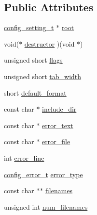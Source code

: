 \subsection*{Public Attributes}
\begin{DoxyCompactItemize}
\item 
\hyperlink{structconfig__setting__t}{config\-\_\-setting\-\_\-t} $\ast$ \hyperlink{structconfig__t_a32f9518ccc7f8a65b5f794fc9d38a565}{root}
\item 
void($\ast$ \hyperlink{structconfig__t_a2d05a50f18015afcd6b4b2a1a97e678c}{destructor} )(void $\ast$)
\item 
unsigned short \hyperlink{structconfig__t_a3c9f48dc1434aa2129fa00c0a4161128}{flags}
\item 
unsigned short \hyperlink{structconfig__t_aaa1a237aeadf1111eaac6946b252c227}{tab\-\_\-width}
\item 
short \hyperlink{structconfig__t_aef80ce4b7772667e6615a19633ce0a65}{default\-\_\-format}
\item 
const char $\ast$ \hyperlink{structconfig__t_a4cfbc200fe5186e02b39a81d6d9171fc}{include\-\_\-dir}
\item 
const char $\ast$ \hyperlink{structconfig__t_ab1af593275e4d341c8cc455a9e84588d}{error\-\_\-text}
\item 
const char $\ast$ \hyperlink{structconfig__t_a244b41324f8458377c6aff4c5caa966f}{error\-\_\-file}
\item 
int \hyperlink{structconfig__t_a4c437bd0d5063aaf27f68cb84bba8616}{error\-\_\-line}
\item 
\hyperlink{libconfig_8h_aa2ee0cc0ed9667955b6c3e93b8577339}{config\-\_\-error\-\_\-t} \hyperlink{structconfig__t_a4619b7a4a2d2259e90137426a4263dbe}{error\-\_\-type}
\item 
const char $\ast$$\ast$ \hyperlink{structconfig__t_a208403fa69f842cb29b8055a0ccb8317}{filenames}
\item 
unsigned int \hyperlink{structconfig__t_ac0ac2e11cba896d1a365aa680125e641}{num\-\_\-filenames}
\end{DoxyCompactItemize}


